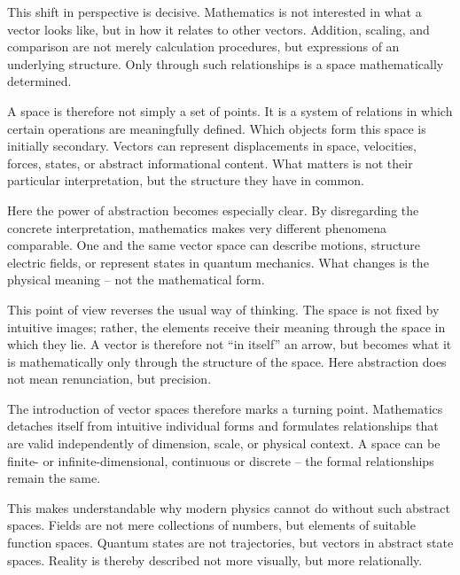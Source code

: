 This shift in perspective is decisive.
Mathematics is not interested in
what a vector looks like,
but in how it relates to other vectors.
Addition,
scaling,
and comparison are not merely calculation procedures,
but expressions of an underlying structure.
Only through such relationships
is a space mathematically determined.

A space is therefore not simply a set of points.
It is a system of relations
in which certain operations are meaningfully defined.
Which objects form this space
is initially secondary.
Vectors can represent displacements in space,
velocities,
forces,
states,
or abstract informational content.
What matters is not their particular interpretation,
but the structure
they have in common.

Here the power of abstraction
becomes especially clear.
By disregarding the concrete interpretation,
mathematics makes very different phenomena comparable.
One and the same vector space
can describe motions,
structure electric fields,
or represent states in quantum mechanics.
What changes
is the physical meaning --
not the mathematical form.

This point of view reverses the usual way of thinking.
The space is not fixed by intuitive images;
rather, the elements receive their meaning
through the space in which they lie.
A vector is therefore not ``in itself'' an arrow,
but becomes what it is mathematically
only through the structure of the space.
Here abstraction does not mean renunciation,
but precision.

The introduction of vector spaces therefore marks a turning point.
Mathematics detaches itself from intuitive individual forms
and formulates relationships
that are valid independently of dimension,
scale,
or physical context.
A space can be finite- or infinite-dimensional,
continuous or discrete --
the formal relationships remain the same.

This makes understandable
why modern physics
cannot do without such abstract spaces.
Fields are not mere collections of numbers,
but elements of suitable function spaces.
Quantum states are not trajectories,
but vectors in abstract state spaces.
Reality
is thereby described not more visually,
but more relationally.

